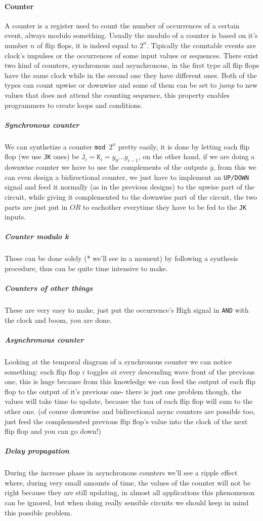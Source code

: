\documentclass{scrartcl}
\begin{document}
    \paragraph{Counter} A counter is a register used to count the number of occurrences of a certain event, always modulo something. Usually the modulo of a counter is based on it's number $n$ of flip flops, it is indeed equal to $2^n$. Tipically the countable events are clock's impulses or the occurrences of some input values or sequences. There exist two kind of counters, synchronous and asynchronous, in the first type all flip flops have the same clock while in the second one they have different ones. Both of the types can count upwise or downwise and some of them can be set to \emph{jump} to new values that does not attend the counting sequence, this property enables programmers to create loops and conditions.
    \subparagraph{Synchronous counter} We can synthetize a counter \texttt{mod $2^n$} pretty easily, it is done by letting each flip flop (we use \texttt{JK} ones) be $\texttt{J}_i=\texttt{K}_i=y_0\dots y_{i-1}$, on the other hand, if we are doing a downwise counter we have to use the complements of the outputs $\overline{y}$, from this we can even design a bidirectional counter, we just have to implement an \texttt{UP/DOWN} signal and feed it normally (as in the previous designs) to the upwise part of the circuit, while giving it complemented to the downwise part of the circuit, the two parts are just put in $OR$ to eachother everytime they have to be fed to the \texttt{JK} inputs.
    \subparagraph{Counter modulo k} These can be done solely (* we'll see in a moment)  by following a synthesis procedure, thus can be quite time intensive to make.
    \subparagraph{Counters of other things} These are very easy to make, just put the occurrence's High signal in \texttt{AND} with the clock and boom, you are done.
    \subparagraph{Asynchronous counter} Looking at the temporal diagram of a synchronous counter we can notice something: each flip flop $i$ toggles at every descending wave front of the previous one, this is huge because from this knowledge we can feed the output of each flip flop to the output of it's previous one- there is just one problem though, the values will take time to update, because the tau of each flip flop will sum to the other one. (of course downwise and bidirectional async counters are possible too, just feed the complemented previous flip flop's value into the clock of the next flip flop and you can go down!)
    \subparagraph{Delay propagation} During the increase phase in asynchronous counters we'll see a ripple effect where, during very small amounts of time, the values of the counter will not be right because they are still updating, in almost all applications this phenomenon can be ignored, but when doing really sensible circuits we should keep in mind this possible problem.
\end{document}
